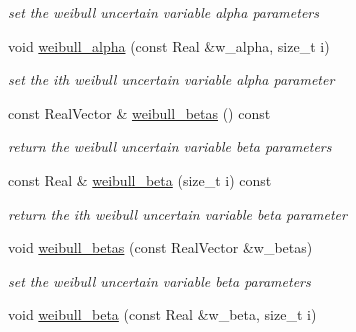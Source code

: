 \begin{DoxyCompactItemize}
\begin{DoxyCompactList}\small\item\em set the weibull uncertain variable alpha parameters \end{DoxyCompactList}\item 
void \hyperlink{classPecos_1_1AleatoryDistParams_ab4699e88478532686d6b1d3d2e4dca97}{weibull\+\_\+alpha} (const Real \&w\+\_\+alpha, size\+\_\+t i)\label{classPecos_1_1AleatoryDistParams_ab4699e88478532686d6b1d3d2e4dca97}

\begin{DoxyCompactList}\small\item\em set the ith weibull uncertain variable alpha parameter \end{DoxyCompactList}\item 
const Real\+Vector \& \hyperlink{classPecos_1_1AleatoryDistParams_a822c69a93b6b518b41f3d6961c79ba56}{weibull\+\_\+betas} () const \label{classPecos_1_1AleatoryDistParams_a822c69a93b6b518b41f3d6961c79ba56}

\begin{DoxyCompactList}\small\item\em return the weibull uncertain variable beta parameters \end{DoxyCompactList}\item 
const Real \& \hyperlink{classPecos_1_1AleatoryDistParams_a7bdd0cf9f709204410969df4cadd4a13}{weibull\+\_\+beta} (size\+\_\+t i) const \label{classPecos_1_1AleatoryDistParams_a7bdd0cf9f709204410969df4cadd4a13}

\begin{DoxyCompactList}\small\item\em return the ith weibull uncertain variable beta parameter \end{DoxyCompactList}\item 
void \hyperlink{classPecos_1_1AleatoryDistParams_adfa27f39f8fd2a1225709978b44b3782}{weibull\+\_\+betas} (const Real\+Vector \&w\+\_\+betas)\label{classPecos_1_1AleatoryDistParams_adfa27f39f8fd2a1225709978b44b3782}

\begin{DoxyCompactList}\small\item\em set the weibull uncertain variable beta parameters \end{DoxyCompactList}\item 
void \hyperlink{classPecos_1_1AleatoryDistParams_a3bf204025b464842171f42fecc6fe1fd}{weibull\+\_\+beta} (const Real \&w\+\_\+beta, size\+\_\+t i)\label{classPecos_1_1AleatoryDistParams_a3bf204025b464842171f42fecc6fe1fd}


\end{DoxyCompactItemize}
